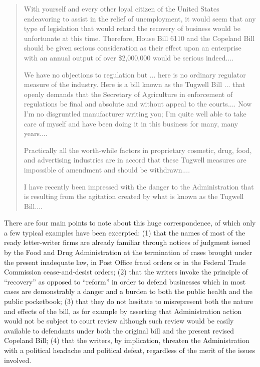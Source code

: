 \documentclass[nohyper,openany,nobib]{tufte-book}
\begin{document}
\begin{quote}
With yourself and every other loyal citizen of the United States
endeavoring to assist in the relief of unemployment, it would seem that
any type of legislation that would retard the recovery of business would
be unfortunate at this time. Therefore, House Bill 6110 and the Copeland
Bill should be given serious consideration as their effect upon an
enterprise with an annual output of over \$2,000,000 would be serious
indeed....

We have no objections to regulation but ... here is no ordinary
regulator measure of the industry. Here is a bill known as the Tugwell
Bill ... that openly demands that the Secretary of Agriculture in
enforcement of regulations be final and absolute and without appeal to
the courts.... Now I'm no disgruntled manufacturer writing you; I'm
quite well able to take care of myself and have been doing it in this
business for many, many years....

Practically all the worth-while factors in proprietary cosmetic, drug,
food, and advertising industries are in accord that these Tugwell
measures are impossible of amendment and should be withdrawn....

I have recently been impressed with the danger to the Administration
that is resulting from the agitation created by what is known as the
Tugwell Bill....
\end{quote}

There are four main points to note about this huge correspondence, of
which only a few typical examples have been excerpted: (1) that the
names of most of the ready letter-writer firms are already familiar
through notices of judgment issued by the Food and Drug Administration
at the termination of cases brought under the present inadequate law, in
Post Office fraud orders or in the Federal Trade Commission
cease-and-desist orders; (2) that the writers invoke the principle of
``recovery'' as opposed to ``reform'' in order to defend businesses
which in most cases are demonstrably a danger and a burden to both the
public health and the public pocketbook; (3) that they do not hesitate
to misrepresent both the nature and effects of the bill, as for example
by asserting that Administration action would not be subject to court
review although such review would be easily available to defendants
under both the original bill and the present revised Copeland Bill; (4)
that the writers, by implication, threaten the Administration with a
political headache and political defeat, regardless of the merit of the
issues involved.
\end{document}
